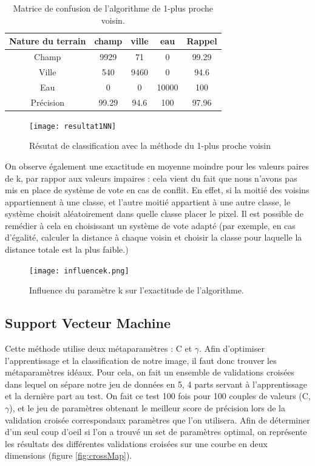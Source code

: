 \documentclass[a4paper,10pt]{article}
\begin{document}
\begin{table}
\begin{center}
 \begin{tabular}{|c|c|c|c|c|}
  \hline
  Nature du terrain & champ & ville & eau & Rappel \\
  \hline
Champ & 9929 & 71 & 	0 &	99.29 \\
Ville & 540 &	9460 &	0 &	94.6 \\
Eau &  0 &	0 &	10000 &	100 \\
Précision & 99.29 & 94.6 & 100 & 97.96 \\
  \hline
\end{tabular}
\end{center}
\label{table:1NN}
\caption{Matrice de confusion de l'algorithme de 1-plus proche voisin.}
\end{table}

\begin{figure}
  \centering
    \texttt{[image: resultat1NN]}
  \caption{Résutat de classification avec la méthode du 1-plus proche voisin}
  \label{fig:1NN}
\end{figure}

On observe également une exactitude en moyenne moindre pour les valeurs paires de k, par rappor aux valeurs impaires : cela vient du fait que nous n'avons pas mis en place de système de vote en cas de conflit. En effet, si la moitié des voisins appartiennent à une classe, et l'autre moitié appartient à une autre classe, le système choisit aléatoirement dans quelle classe placer le pixel. Il est possible de remédier à cela en choisissant un système de vote adapté (par exemple, en cas d'égalité, calculer la distance à chaque voisin et choisir la classe pour laquelle la distance totale est la plus faible.)

\begin{figure}
  \centering
    \texttt{[image: influencek.png]}
  \caption{Influence du paramètre k sur l'exactitude de l'algorithme.}
  \label{fig:kNN}
\end{figure}


\subsection{Support Vecteur Machine}
Cette méthode utilise deux métaparamètres : C et $\gamma$. Afin d'optimiser l'apprentissage et la classification de notre image, il faut donc trouver les métaparamètres idéaux. Pour cela, on fait un ensemble de validations croisées dans lequel on sépare notre jeu de données en 5, 4 parts servant à l'apprentissage et la dernière part au test. On fait ce test 100 fois pour 100 couples de valeurs (C,$\gamma$), et le jeu de paramètres obtenant le meilleur score de précision lors de la validation croisée correspondaux paramètres que l'on utilisera. Afin de déterminer d'un seul coup d'oeil si l'on a trouvé un set de paramètres optimal, on représente les résultats des différentes validations croisées sur une courbe en deux dimensions (figure \ref{fig:crossMap}).
\end{document}
